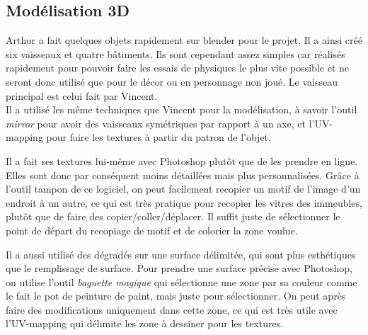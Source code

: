 \documentclass[10pt, titlepage]{report}
\begin{document}
\subsection{Modélisation 3D}

Arthur a fait quelques objets rapidement sur blender pour le projet. Il a ainsi créé six vaisseaux et quatre bâtiments. Ils sont cependant assez simples car réalisés rapidement pour pouvoir faire les essais de physiques le plus vite possible et ne seront donc utilisé que pour le décor ou en personnage non joué. Le vaisseau principal est celui fait par Vincent.\\

Il a utilisé les même techniques que Vincent pour la modélisation, à savoir l'outil \textit{mirror} pour avoir des vaisseaux symétriques par rapport à un axe, et  l'UV-mapping pour faire les textures à partir du patron de l'objet.

Il a fait ses textures lui-même avec Photoshop plutôt que de les prendre en ligne. Elles sont donc par conséquent moins détaillées mais plus personnalisées. Grâce à l'outil tampon de ce logiciel, on peut facilement recopier un motif de l'image d'un endroit à un autre, ce qui est très pratique pour recopier les vitres des immeubles, plutôt que de faire des copier/coller/déplacer. Il suffit juste de sélectionner le point de départ du recopiage de motif et de colorier la zone voulue.

 Il a aussi utilisé des dégradés sur une surface délimitée, qui sont plus esthétiques que le remplissage de surface. Pour prendre une surface précise avec Photoshop, on utilise l'outil \textit{baguette magique} qui sélectionne une zone par sa couleur comme le fait le pot de peinture de paint, mais juste pour sélectionner. On peut après faire des modifications uniquement dans cette zone, ce qui est très utile avec l'UV-mapping qui délimite les zone à dessiner pour les textures.\\
\end{document}
